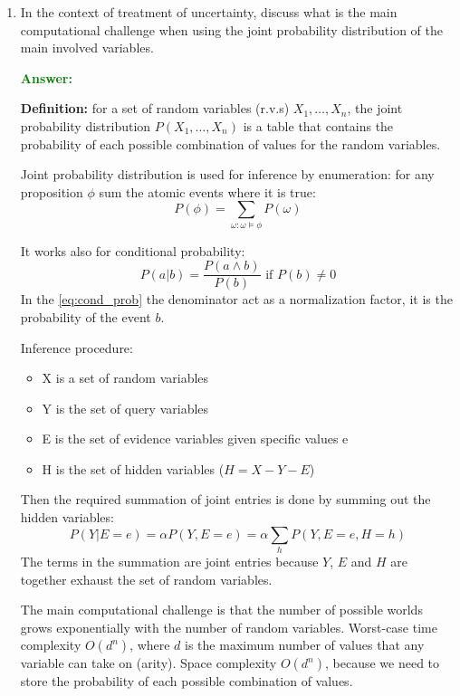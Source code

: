 \documentclass[12pt]{article}
\begin{document}
\begin{enumerate}[label=\textbf{U.\arabic*}]
    \item In the context of treatment of uncertainty, discuss what is the main computational challenge when using the joint probability distribution of the main involved variables.
    
    \textcolor{green}{\textbf{Answer:}}

    \textbf{Definition:} for a set of random variables (r.v.s) $X_1,\ldots,X_n$, the joint probability distribution $P(X_1,\ldots,X_n)$ is a table that contains the probability of each possible combination of values for the random variables.

    Joint probability distribution is used for inference by enumeration: for any proposition $\phi$ sum the atomic events where it is true:
    \begin{equation}
        P(\phi) = \sum_{\omega:\omega\vDash\phi}P(\omega)
    \end{equation} 

    It works also for conditional probability:
    \begin{equation}\label{eq:cond_prob}
        P(a|b) = \frac{P(a\land b)}{P(b)} \text{ if } P(b) \neq 0
    \end{equation}
    In the \ref{eq:cond_prob} the denominator act as a normalization factor, it is the probability of the event $b$.

    Inference procedure: 
    \begin{itemize}
        \item X is a set of random variables 
        \item Y is the set of query variables  
        \item E is the set of evidence variables given specific values e
        \item H is the set of hidden variables ($H = X - Y - E$)
    \end{itemize}
    Then the required summation of joint entries is done by summing out the hidden variables:
    \begin{equation}
        P(Y|E = e) = \alpha P(Y,E = e) = \alpha\sum_{h}P(Y,E = e,H = h)
    \end{equation}
    The terms in the summation are joint entries because $Y$, $E$ and $H$ are together exhaust the set of random variables.

    The main computational challenge is that the number of possible worlds grows exponentially with the number of random variables.
    Worst-case time complexity $O(d^n)$, where $d$ is the maximum number of values that any variable can take on (arity).
    Space complexity $O(d^n)$, because we need to store the probability of each possible combination of values.



\end{enumerate}
\end{document}
